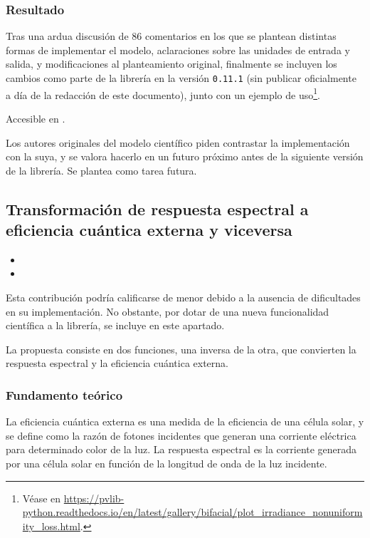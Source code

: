 \subsubsection{Resultado}

Tras una ardua discusión de 86 comentarios en los que se plantean distintas formas de implementar el modelo, aclaraciones sobre las unidades de entrada y salida, y modificaciones al planteamiento original, finalmente se incluyen los cambios como parte de la librería en la versión \texttt{0.11.1} (sin publicar oficialmente a día de la redacción de este documento), junto con un ejemplo de uso\footnote{Véase en \url{https://pvlib-python.readthedocs.io/en/latest/gallery/bifacial/plot_irradiance_nonuniformity_loss.html}.}.

Accesible en .

Los autores originales del modelo científico piden contrastar la implementación con la suya, y se valora hacerlo en un futuro próximo antes de la siguiente versión de la librería. Se plantea como tarea futura.

\subsection{Transformación de respuesta espectral a eficiencia cuántica externa y viceversa}

\begin{itemize}
    \item {}
    \item {}
\end{itemize}

Esta contribución podría calificarse de menor debido a la ausencia de dificultades en su implementación. No obstante, por dotar de una nueva funcionalidad científica a la librería, se incluye en este apartado.

La propuesta consiste en dos funciones, una inversa de la otra, que convierten la respuesta espectral y la eficiencia cuántica externa.

\subsubsection{Fundamento teórico}

La eficiencia cuántica externa es una medida de la eficiencia de una célula solar, y se define como la razón de fotones incidentes que generan una corriente eléctrica para determinado color de la luz. La respuesta espectral es la corriente generada por una célula solar en función de la longitud de onda de la luz incidente.


